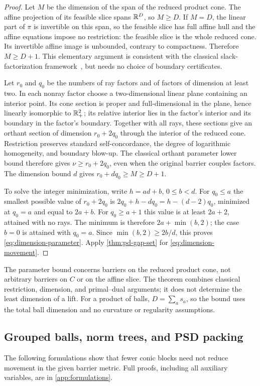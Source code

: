 \begin{proof}
Let $M$ be the dimension of the span of the reduced product cone.
The affine projection of its feasible slice spans $\mathbb R^D$, so $M\geq D$.
If $M=D$, the linear part of $\pi$ is invertible on this span, so the
feasible slice has full affine hull and the affine equations impose no
restriction: the feasible slice is the whole reduced cone.
Its invertible affine image is unbounded, contrary to compactness.
Therefore $M\geq D+1$. This elementary argument is consistent
with the classical slack-factorization framework~\cite{GouveiaParriloThomas2013},
but needs no choice of boundary certificates.

Let $r_0$ and $q_0$ be the numbers of ray factors and of factors
of dimension at least two. In each nonray factor choose a two-dimensional linear plane
containing an interior point. Its cone section is proper and
full-dimensional in the plane, hence linearly isomorphic to $\mathbb R_+^2$;
its relative interior lies in the factor's interior and its boundary in
the factor's boundary. Together with all rays, these sections give an orthant section of
dimension $r_0+2q_0$ through the interior of the reduced cone.
Restriction preserves standard self-concordance, the degree of
logarithmic homogeneity, and boundary blow-up. The classical orthant parameter lower bound
\cite{NesterovNemirovskii1994,Hildebrand2013} therefore gives
$\nu\geq r_0+2q_0$, even when the original barrier couples factors.
The dimension bound $d$ gives $r_0+dq_0\geq M\geq D+1$.

To solve the integer minimization, write $h=ad+b$, $0\leq b<d$.
For $q_0\leq a$ the smallest possible value of $r_0+2q_0$ is
$2q_0+h-dq_0=h-(d-2)q_0$, minimized at $q_0=a$ and equal to $2a+b$.
For $q_0\geq a+1$ this value is at least $2a+2$, attained with no
rays. The minimum is therefore $2a+\min(b,2)$; the case $b=0$ is
attained with $q_0=a$. Since $\min(b,2)\geq2b/d$, this proves
\eqref{eq:dimension-parameter}. Apply \cref{thm:pd-gap-set} for
\eqref{eq:dimension-movement}.
\end{proof}
The parameter bound concerns barriers on the reduced product cone, not
arbitrary barriers on $C$ or on the affine slice. The theorem combines
classical restriction, dimension, and primal--dual arguments; it does not determine the least dimension of a lift. For a
product of balls, $D=\sum_as_a$, so the bound uses the total ball
dimension and no curvature or regularity assumptions.

\subsection{Grouped balls, norm trees, and PSD packing}
\label{subsec:concrete-formulations}
The following formulations show that fewer conic blocks need not
reduce movement in the given barrier metric. Full proofs,
including all auxiliary variables, are in \cref{app:formulations}.

